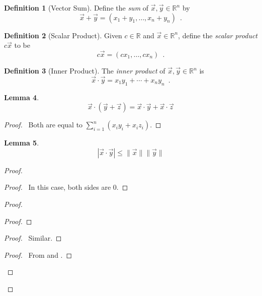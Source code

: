 \documentclass{report}
\let\qed\relax
\newtheorem{lm}{Lemma}[section]
\theoremstyle{definition}
\newtheorem{df}[lm]{Definition}
\begin{document}
  \begin{df}[Vector Sum]
    Define the \emph{sum} of $\vec{x}, \vec{y} \in \mathbb{R}^n$ by
    \[ \vec{x} + \vec{y} = (x_1 + y_1, \ldots, x_n + y_n) \enspace . \]
  \end{df}

  \begin{df}[Scalar Product]
    Given $c \in \mathbb{R}$ and $\vec{x} \in \mathbb{R}^n$, define the
    \emph{scalar product} $c \vec{x}$ to be
    \[ c \vec{x} = (c x_1, \ldots, c x_n) \enspace . \]
  \end{df}

  \begin{df}[Inner Product]
    The \emph{inner product} of $\vec{x}, \vec{y} \in \mathbb{R}^n$ is
    \[ \vec{x} \cdot \vec{y} = x_1 y_1 + \cdots + x_n y_n \enspace . \]
  \end{df}

  \begin{lm}
    \label{lm:norm:distribute}
    \[ \vec{x} \cdot (\vec{y} + \vec{z}) = \vec{x} \cdot \vec{y} + \vec{x}
    \cdot \vec{z} \]
  \end{lm}

  \begin{proof}
    \pf\ Both are equal to $\sum_{i=1}^n (x_i y_i + x_i z_i)$. \qed
  \end{proof}

  \begin{lm}
    \label{lm:norm:cauchy_schwarz}
    \[ |\vec{x} \cdot \vec{y}| \leq \|\vec{x}\| \|\vec{y}\| \]
  \end{lm}

  \begin{proof}
    \pf
    \begin{proof}
      \pf\ In this case, both sides are 0.
    \end{proof}
    \begin{proof}
      \begin{proof}
      \end{proof}
      \begin{proof}
        \pf\ Similar.
      \end{proof}
      \begin{proof}
        \pf\ From  and .
      \end{proof}
    \end{proof}
    \qed
  \end{proof}
\end{document}
